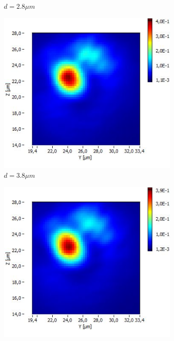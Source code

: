 \documentclass[a4paper,11pt]{article}
\begin{document}
\begin{figure}[htb]
\begin{subfigure}[b]{.20\linewidth}
    \caption{$d=2.8\mu m$}
  \end{subfigure}
  \begin{subfigure}[b]{.20\linewidth}
    \centering
    \includegraphics[width=\textwidth]{Fibre5/scan_023_g1.jpg}
    \caption{$d=3.8\mu m$}
  \end{subfigure}
  \begin{subfigure}[b]{.20\linewidth}
    \centering
    \includegraphics[width=\textwidth]{Fibre5/scan_024_g1.jpg}

\end{subfigure}
\end{figure}
\end{document}
